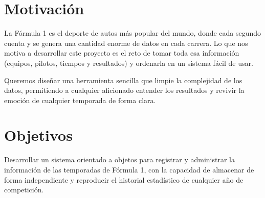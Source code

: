 \documentclass[12pt,a4paper]{article}
\begin{document}
\section{Motivación}
La Fórmula 1 es el deporte de autos más popular del mundo, donde cada segundo cuenta y se genera una cantidad enorme de datos en cada carrera. Lo que nos motiva a desarrollar este proyecto es el reto de tomar toda esa información (equipos, pilotos, tiempos y resultados) y ordenarla en un sistema fácil de usar. 

Queremos diseñar una herramienta sencilla que limpie la complejidad de los datos, permitiendo a cualquier aficionado entender los resultados y revivir la emoción de cualquier temporada de forma clara.

\section{Objetivos}
Desarrollar un sistema orientado a objetos para registrar y administrar la información de las temporadas de Fórmula 1, con la capacidad de almacenar de forma independiente y reproducir el historial estadístico de cualquier año de competición.
\end{document}
